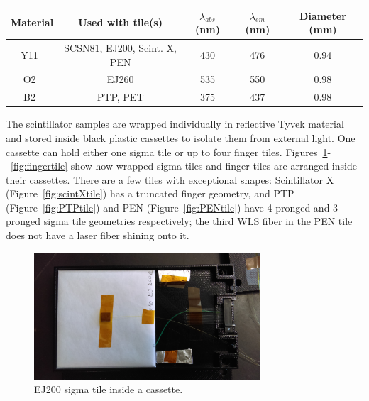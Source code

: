 \begin{table}[htbh]
\begin{center}
\begin{tabular}{|c|c|c|c|c|}
\hline
Material & Used with tile(s) & $\lambda_{abs}$ (nm) & $\lambda_{em}$ (nm) & Diameter (mm) \\
\hline
Y11~\cite{KuraWLS} & SCSN81, EJ200, Scint. X, PEN & 430 & 476 & 0.94 \\
O2~\cite{KuraWLS} & EJ260 & 535 & 550 & 0.98 \\
B2~\cite{KuraWLS} & PTP, PET & 375 & 437 & 0.98 \\
\hline
\end{tabular}
\end{center}
\end{table}

The scintillator samples are wrapped individually in reflective Tyvek material and stored inside black plastic cassettes to isolate them from external light. One cassette can hold either one sigma tile or up to four finger tiles. Figures~\ref{fig:sigmatile}-~\ref{fig:fingertile} show how wrapped sigma tiles and finger tiles are arranged inside their cassettes. There are a few tiles with exceptional shapes: Scintillator X (Figure~\ref{fig:scintXtile}) has a truncated finger geometry, and PTP (Figure~\ref{fig:PTPtile}) and PEN (Figure~\ref{fig:PENtile}) have 4-pronged and 3-pronged sigma tile geometries respectively; the third WLS fiber in the PEN tile does not have a laser fiber shining onto it.

\begin{figure}[hbtp]
\begin{center}
\includegraphics[width=0.75\textwidth]{figures/sigmatile}
\caption{EJ200 sigma tile inside a cassette.}
\label{fig:sigmatile}
\end{center}
\end{figure}

